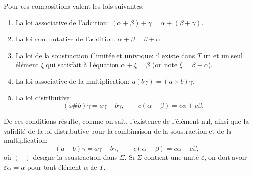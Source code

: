 Pour ces compositions valent les lois suivantes:
\begin{enumerate}
\item La loi associative de l'addition: $(\alpha+\beta)+\gamma=\alpha+(\beta+\gamma)$.
\item La loi commutative de l'addition: $\alpha+\beta=\beta+\alpha$.
\item La loi de la soustraction illimitée et univoque: il existe dans $T$ un et un seul élément $\xi$ qui satisfait à l'équation $\alpha+\xi=\beta$ (on note $\xi=\beta-\alpha$).
\item La loi associative de la multiplication: $a(b\gamma)=(a\times b)\gamma$.
\item La loi distributive:
\[
 (a\# b)\gamma=a\gamma+b\gamma,\qquad c(\alpha+\beta)=c\alpha+c\beta.
\]
\end{enumerate}
De ces conditions résulte, comme on sait, l'existence de l'élément nul, ainsi que la validité de la loi distributive pour la combinaison de la soustraction et de la multiplication:
\[
 (a-b)\gamma=a\gamma-b\gamma,\qquad c(\alpha-\beta)=c\alpha-c\beta,
\]
où $(-)$ désigne la soustraction dans $\Sigma$. Si $\Sigma$ contient une unité $\varepsilon$, on doit avoir $\varepsilon\alpha=\alpha$ pour tout élément $\alpha$ de $T$.

